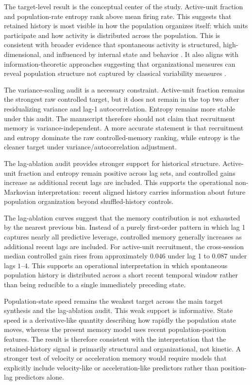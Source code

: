 \documentclass[11pt]{article}
\begin{document}
The target-level result is the conceptual center of the study. Active-unit fraction and population-rate entropy rank above mean firing rate. This suggests that retained history is most visible in how the population organizes itself: which units participate and how activity is distributed across the population. This is consistent with broader evidence that spontaneous activity is structured, high-dimensional, and influenced by internal state and behavior \citep{Stringer2019Spontaneous,Akella2025LatentStates,Sederberg2024LatentDynamics}. It also aligns with information-theoretic approaches suggesting that organizational measures can reveal population structure not captured by classical variability measures \citep{DePaula2025StatisticalComplexity}.

The variance-scaling audit is a necessary constraint. Active-unit fraction remains the strongest raw controlled target, but it does not remain in the top two after residualizing variance and lag-1 autocorrelation. Entropy remains more stable under this audit. The manuscript therefore should not claim that recruitment memory is variance-independent. A more accurate statement is that recruitment and entropy dominate the raw controlled-memory ranking, while entropy is the cleaner target under variance/autocorrelation adjustment.

The lag-ablation audit provides stronger support for historical structure. Active-unit fraction and entropy remain positive across lag sets, and controlled gains increase as additional recent lags are included. This supports the operational non-Markovian interpretation: recent aligned history carries information about future population organization beyond shuffled-history controls.

The lag-ablation curves suggest that the memory contribution is not exhausted by the nearest previous bin. Instead of a purely first-order pattern in which lag 1 captures nearly all predictive leverage, controlled memory generally increases as additional recent lags are included. For active-unit recruitment, the cross-session median controlled gain rises from approximately \(0.046\) under lag 1 to \(0.087\) under lags \(1\)--\(4\). This supports an operational interpretation in which spontaneous population history is distributed across a short recent temporal window rather than being reducible to a single immediately preceding state.

Population-state speed remains the weakest target across the main target synthesis and the lag-ablation audit. This weak support is informative. State speed is a derivative-like quantity describing how rapidly the population state moves, whereas the present memory model uses recent population-position features. The result is therefore consistent with the interpretation that the retained-history signal is primarily structural and organizational, not kinetic. A stronger test of velocity or acceleration memory would require models that explicitly include velocity-like or acceleration-like predictors rather than position-lag predictors alone.
\end{document}
